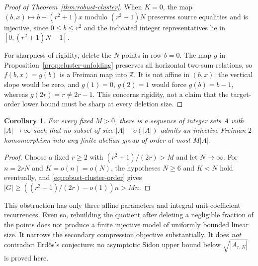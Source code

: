 \documentclass[11pt]{article}
\newtheorem{corollary}[theorem]{Corollary}
\theoremstyle{definition}
\theoremstyle{remark}
\newcommand{\Z}{\mathbb Z}
\begin{document}
\begin{proof}[Proof of Theorem~\ref{thm:robust-cluster}]
When $K=0$, the map
$(b,x)\mapsto b+(r^2+1)x$ modulo $(r^2+1)N$ preserves source
equalities and is injective, since $0\le b\le r^2$ and the indicated
integer representatives lie in $[0,(r^2+1)N-1]$.

For sharpness of rigidity, delete the $N$ points in row $b=0$.
The map $g$ in Proposition~\ref{prop:cluster-unfolding} preserves all
horizontal two-sum relations, so $f(b,x)=g(b)$ is a Freiman map into
$\Z$. It is not affine in $(b,x)$: the vertical slope would be zero,
and $g(1)=0$, $g(2)=1$ would force $g(b)=b-1$, whereas
$g(2r)=r\ne2r-1$. This concerns rigidity, not a claim that the
target-order lower bound must be sharp at every deletion size.
\end{proof}

\begin{corollary}\label{cor:no-near-lossless-model}
For every fixed $M>0$, there is a sequence of integer sets $A$ with
$|A|\to\infty$ such that no subset of size $|A|-o(|A|)$ admits an
injective Freiman $2$-homomorphism into any finite abelian group of
order at most $M|A|$.
\end{corollary}
\begin{proof}
Choose a fixed $r\ge2$ with $(r^2+1)/(2r)>M$ and let $N\to\infty$.
For $n=2rN$ and $K=o(n)=o(N)$, the hypotheses $N\ge6$ and $K<N$ hold
eventually, and \eqref{eq:robust-cluster-order} gives
$|G|\ge((r^2+1)/(2r)-o(1))n>Mn$.
\end{proof}

This obstruction has only three affine parameters and integral
unit-coefficient recurrences. Even so, rebuilding the quotient after
deleting a negligible fraction of the points does not produce a finite
injective model of uniformly bounded linear size.
It narrows the secondary compression objective substantially.
It does \emph{not} contradict Erd\H{o}s's conjecture: no asymptotic
Sidon upper bound below $\sqrt{|A_{r,N}|}$ is proved here.
\end{document}
